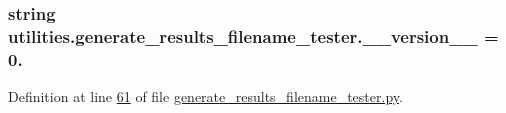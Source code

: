\subsubsection[{\+\_\+\+\_\+version\+\_\+\+\_\+}]{\setlength{\rightskip}{0pt plus 5cm}string utilities.\+generate\+\_\+results\+\_\+filename\+\_\+tester.\+\_\+\+\_\+version\+\_\+\+\_\+ = \textquotesingle{}0.\textquotesingle{}}\label{namespaceutilities_1_1generate__results__filename__tester_a36b6e38cf86170c416ee9e059c4579ee}


Definition at line \hyperlink{generate__results__filename__tester_8py_source_l00061}{61} of file \hyperlink{generate__results__filename__tester_8py_source}{generate\+\_\+results\+\_\+filename\+\_\+tester.\+py}.


